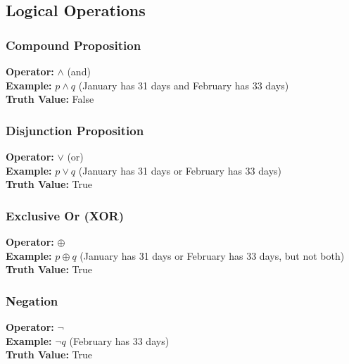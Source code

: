 \documentclass[twoside]{article}
\begin{document}
\subsection{Logical Operations}
\subsubsection{Compound Proposition}
\newline\newline
\textbf{Operator:} $\land$ (and)  \\
\textbf{Example:} $p \land q$ (January has 31 days and February has 33 days)  \\
\textbf{Truth Value:} False

\subsubsection{Disjunction Proposition}
\textbf{Operator:} $\lor$ (or)  \\
\textbf{Example:} $p \lor q$ (January has 31 days or February has 33 days)  \\
\textbf{Truth Value:} True

\subsubsection{Exclusive Or (XOR)}
\textbf{Operator:} $\oplus$  \\
\textbf{Example:} $p \oplus q$ (January has 31 days or February has 33 days, but not both)  \\
\textbf{Truth Value:} True

\subsubsection{Negation}
\textbf{Operator:} $\neg$  \\
\textbf{Example:} $\neg q$ (February has 33 days)  \\
\textbf{Truth Value:} True
\end{document}
